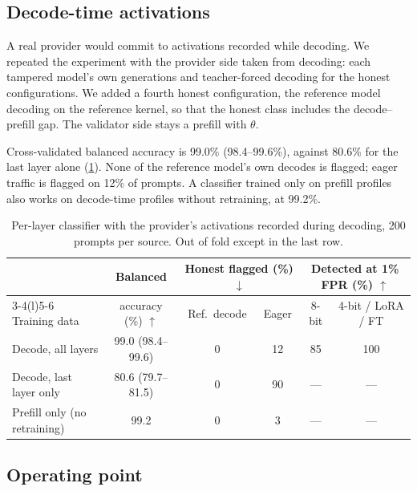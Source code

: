 \documentclass[10pt,twocolumn]{article}
\newcommand{\best}[1]{\cellcolor{blue!8}#1}
\newcommand{\up}{$\uparrow$}
\newcommand{\down}{$\downarrow$}
\begin{document}
\subsection{Decode-time activations}
\label{sec:res-decode}

A real provider would commit to activations recorded while decoding.
We repeated the experiment with the provider side taken from decoding: each tampered model's own generations and teacher-forced decoding for the honest configurations.
We added a fourth honest configuration, the reference model decoding on the reference kernel, so that the honest class includes the decode--prefill gap.
The validator side stays a prefill with $\theta$.

Cross-validated balanced accuracy is 99.0\% (98.4--99.6\%), against 80.6\% for the last layer alone (\cref{tab:decode}).
None of the reference model's own decodes is flagged; eager traffic is flagged on 12\% of prompts.
A classifier trained only on prefill profiles also works on decode-time profiles without retraining, at 99.2\%.

\begin{table}[!t]
\centering
\small
\caption{Per-layer classifier with the provider's activations recorded during decoding, 200 prompts per source. Out of fold except in the last row.}
\label{tab:decode}
\begin{tabular}{@{}lccccc@{}}
\toprule
 & Balanced & \multicolumn{2}{c}{Honest flagged (\%) \down} & \multicolumn{2}{c}{Detected at 1\% FPR (\%) \up} \\
\cmidrule(lr){3-4}\cmidrule(l){5-6}
Training data & accuracy (\%) \up & Ref.\ decode & Eager & 8-bit & 4-bit / LoRA / FT \\
\midrule
Decode, all layers               & \best{99.0} {\scriptsize(98.4--99.6)} & 0 & 12 & 85 & 100 \\
Decode, last layer only          & 80.6 {\scriptsize(79.7--81.5)} & 0 & 90 & --- & --- \\
Prefill only (no retraining)     & 99.2 & 0 & 3 & --- & --- \\
\bottomrule
\end{tabular}
\end{table}

\subsection{Operating point}
\label{sec:res-op}
\end{document}
